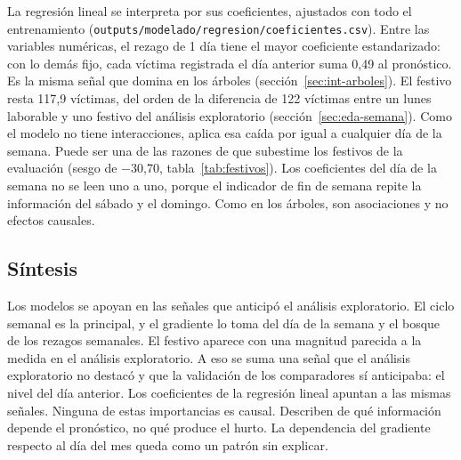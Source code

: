 La regresión lineal se interpreta por sus coeficientes, ajustados con todo el entrenamiento (\texttt{outputs/\allowbreak{}modelado/\allowbreak{}regresion/\allowbreak{}coeficientes.csv}). Entre las variables numéricas, el rezago de 1 día tiene el mayor coeficiente estandarizado: con lo demás fijo, cada víctima registrada el día anterior suma 0,49 al pronóstico. Es la misma señal que domina en los árboles (sección~\ref{sec:int-arboles}). El festivo resta 117,9 víctimas, del orden de la diferencia de 122 víctimas entre un lunes laborable y uno festivo del análisis exploratorio (sección~\ref{sec:eda-semana}). Como el modelo no tiene interacciones, aplica esa caída por igual a cualquier día de la semana. Puede ser una de las razones de que subestime los festivos de la evaluación (sesgo de $-$30,70, tabla~\ref{tab:festivos}). Los coeficientes del día de la semana no se leen uno a uno, porque el indicador de fin de semana repite la información del sábado y el domingo. Como en los árboles, son asociaciones y no efectos causales.

\subsection{Síntesis}\label{sec:int-sintesis}

Los modelos se apoyan en las señales que anticipó el análisis exploratorio. El ciclo semanal es la principal, y el gradiente lo toma del día de la semana y el bosque de los rezagos semanales. El festivo aparece con una magnitud parecida a la medida en el análisis exploratorio. A eso se suma una señal que el análisis exploratorio no destacó y que la validación de los comparadores sí anticipaba: el nivel del día anterior. Los coeficientes de la regresión lineal apuntan a las mismas señales. Ninguna de estas importancias es causal. Describen de qué información depende el pronóstico, no qué produce el hurto. La dependencia del gradiente respecto al día del mes queda como un patrón sin explicar.
